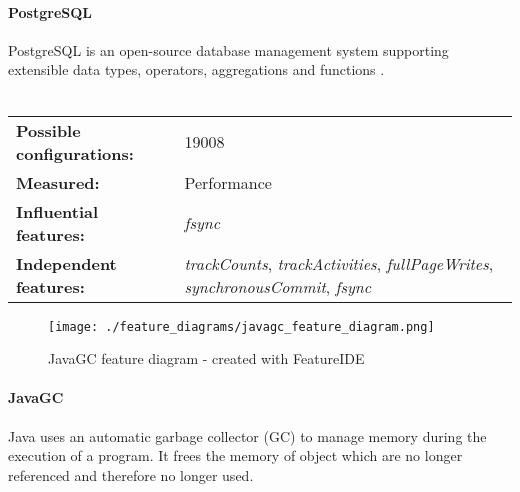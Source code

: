 \documentclass[../../thesis.tex]{subfiles}
\begin{document}
\paragraph{PostgreSQL}
PostgreSQL is an open-source database management system supporting extensible data types, operators, aggregations and functions \cite{web:postgresql}.
\\ \\
\begingroup
\renewcommand{\arraystretch}{1.5}
\begin{tabular}{lp{}}
    \textbf{Possible configurations:} & 19008                                                                                                               \\
    \textbf{Measured:}                & Performance                                                                                                         \\
    \textbf{Influential features:}    & \textit{fsync}                                                                                                      \\
    \textbf{Independent features:}    & \textit{trackCounts}, \textit{trackActivities}, \textit{fullPageWrites}, \textit{synchronousCommit}, \textit{fsync} \\
\end{tabular}
\endgroup



\newpage
\begin{figure}[t]
    \begin{center}
        \texttt{[image: ./feature\_diagrams/javagc\_feature\_diagram.png]}
    \end{center}
    \caption[Feature diagram - JavaGC]{JavaGC feature diagram - created with FeatureIDE}\label{fig:feature_diagram:javagc}
\end{figure}
\paragraph{JavaGC} Java uses an automatic garbage collector (GC) to manage memory during the execution of a program.
It frees the memory of object which are no longer referenced and therefore no longer used.
\end{document}
